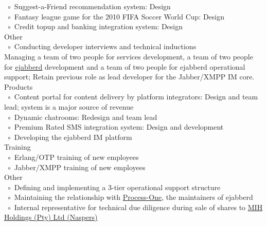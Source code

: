 \documentclass[10pt,a4paper,final]{columncv}
\newcommand{\cvitembullet}{~$\circ$~}
\newcommand{\cvitempbullet}{\phantom{\cvitembullet}}
\begin{document}
\begin{cvenv}
{          \cvitembullet Suggest-a-Friend recommendation system: Design \\
          \cvitembullet Fantasy league game for the 2010 FIFA Soccer World Cup: Design \\
          \cvitembullet Credit topup and banking integration system: Design \\
          Other \\
          \cvitembullet Conducting developer interviews and technical inductions \\}
         {Managing a team of two people for services development, a team of two people for 
          \href{http://www.process-one.net/en/ejabberd/}{ejabberd} development and a team 
          of two people for ejabberd operational support; 
          Retain previous role as lead developer for the Jabber/XMPP IM core.}
          {Products \\
           \cvitembullet Content portal for content delivery by platform integrators: 
           \cvitempbullet Design and team lead; system is a major source of revenue \\ 
           \cvitembullet Dynamic chatrooms: Redesign and team lead \\
           \cvitembullet Premium Rated SMS integration system: Design and development \\
           \cvitembullet Developing the ejabberd IM platform \\
           Training \\
           \cvitembullet Erlang/OTP training of new employees \\
           \cvitembullet Jabber/XMPP training of new employees \\
           Other \\
           \cvitembullet Defining and implementing a 3-tier operational support structure \\
           \cvitembullet Maintaining the relationship with 
                    \href{http://www.process-one.net/en/}{Process-One}, the maintainers  
           \cvitempbullet of ejabberd \\
           \cvitembullet Internal representative for technical due diligence during sale of 
           \cvitempbullet shares to \href{http://www.naspers.com/}{MIH Holdings (Pty) Ltd (Naspers)} \\}
\end{cvenv}
\end{document}
